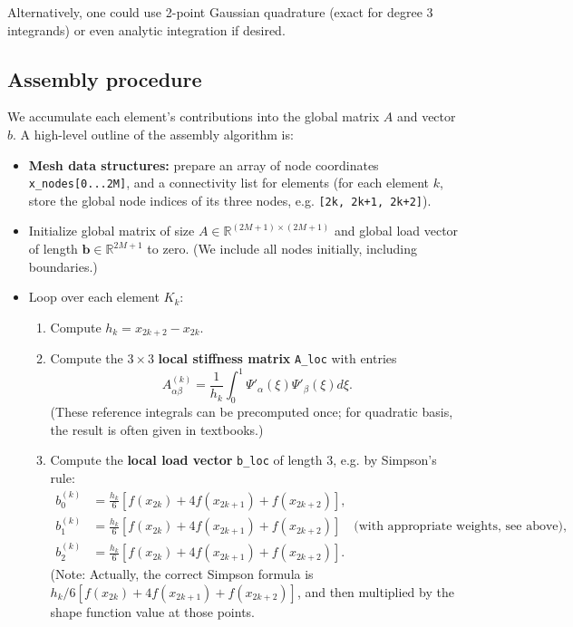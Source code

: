 \documentclass[a4paper,10pt]{article}
\begin{document}
Alternatively, one could use 2-point Gaussian quadrature (exact for degree 3 integrands) or even analytic integration if desired.

\subsection*{Assembly procedure}
We accumulate each element's contributions into the global matrix \(A\) and vector \(b\). A high-level outline of the assembly algorithm is:
\begin{itemize}
	\item \textbf{Mesh data structures:}
	      prepare an array of node coordinates \texttt{x_nodes[0...2M]}, and a connectivity list for elements (for each element \(k\), store the global node indices of its three nodes, e.g. \texttt{[2k, 2k+1, 2k+2]}).
	\item Initialize global matrix of size \(A \in \mathbb{R}^{(2M+1)\times(2M+1)}\) and global load vector of length \(\mathbf{b} \in \mathbb{R}^{2M+1}\) to zero.
	      (We include all nodes initially, including boundaries.)
	\item Loop over each element \(K_k\):
	      \begin{enumerate}
		      \item Compute \(h_k = x_{2k+2} - x_{2k}\).
		      \item  Compute the \(3 \times 3\) \textbf{local stiffness matrix} \texttt{A_loc} with entries
		            \[A^{(k)}_{\alpha\beta} = \frac{1}{h_k}\int_0^1 \Psi'_{\alpha}(\xi)\Psi'_{\beta}(\xi)d\xi.\]
		            (These reference integrals can be precomputed once; for quadratic basis, the result is often given in textbooks.)
		      \item Compute the \textbf{local load vector} \texttt{b_loc} of length 3, e.g. by Simpson's rule:
		            \begin{align*}
			            b^{(k)}_0 & = \frac{h_k}{6}[f(x_{2k}) + 4f(x_{2k+1}) + f(x_{2k+2})],                                                   \\
			            b^{(k)}_1 & = \frac{h_k}{6}[f(x_{2k}) + 4f(x_{2k+1}) + f(x_{2k+2})] \quad\text{(with appropriate weights, see above)}, \\
			            b^{(k)}_2 & = \frac{h_k}{6}[f(x_{2k}) + 4f(x_{2k+1}) + f(x_{2k+2})].
		            \end{align*}
		            (Note: Actually, the correct Simpson formula is \(h_k/6 [f(x_{2k}) + 4f(x_{2k+1}) + f(x_{2k+2})]\), and then multiplied by the shape function value at those points.

\end{enumerate}
\end{itemize}
\end{document}
